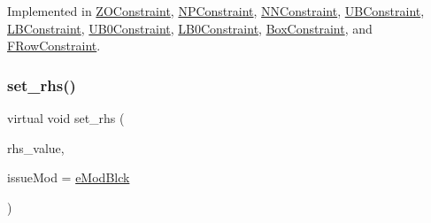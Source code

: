 Implemented in \mbox{\hyperlink{class_s_m_spp__di__unipi__it_1_1_z_o_constraint_a04d6bd47ee1aef8d3bfa2486b2732bd3}{Z\+O\+Constraint}}, \mbox{\hyperlink{class_s_m_spp__di__unipi__it_1_1_n_p_constraint_a307924d9ed36541d2a4fc32494c087ee}{N\+P\+Constraint}}, \mbox{\hyperlink{class_s_m_spp__di__unipi__it_1_1_n_n_constraint_a307924d9ed36541d2a4fc32494c087ee}{N\+N\+Constraint}}, \mbox{\hyperlink{class_s_m_spp__di__unipi__it_1_1_u_b_constraint_a307924d9ed36541d2a4fc32494c087ee}{U\+B\+Constraint}}, \mbox{\hyperlink{class_s_m_spp__di__unipi__it_1_1_l_b_constraint_a307924d9ed36541d2a4fc32494c087ee}{L\+B\+Constraint}}, \mbox{\hyperlink{class_s_m_spp__di__unipi__it_1_1_u_b0_constraint_a307924d9ed36541d2a4fc32494c087ee}{U\+B0\+Constraint}}, \mbox{\hyperlink{class_s_m_spp__di__unipi__it_1_1_l_b0_constraint_a307924d9ed36541d2a4fc32494c087ee}{L\+B0\+Constraint}}, \mbox{\hyperlink{class_s_m_spp__di__unipi__it_1_1_box_constraint_a04d6bd47ee1aef8d3bfa2486b2732bd3}{Box\+Constraint}}, and \mbox{\hyperlink{class_s_m_spp__di__unipi__it_1_1_f_row_constraint_a04d6bd47ee1aef8d3bfa2486b2732bd3}{F\+Row\+Constraint}}.

\mbox{\label{class_s_m_spp__di__unipi__it_1_1_row_constraint_a42d5ec40966a094c7fa805a5ea44337b}} 
\subsubsection{\texorpdfstring{set\+\_\+rhs()}{set\_rhs()}}
{\footnotesize\ttfamily virtual void set\+\_\+rhs (\begin{DoxyParamCaption}\item[{\mbox{\hyperlink{class_s_m_spp__di__unipi__it_1_1_row_constraint_a34abd4b01d3a2024be5f6d13dd88779f}{c\+\_\+\+R\+H\+S\+Value}}}]{rhs\+\_\+value,  }\item[{\mbox{\hyperlink{group___modification___t_y_p_e_s_ga544246d8c462e9a2d817c2c30797968f}{c\+\_\+\+Mod\+Param}}}]{issue\+Mod = {\ttfamily \mbox{\hyperlink{group___modification___t_y_p_e_s_gga48fddcdd03a03f49b7e389ca1ed938d4a21b14b26b1c0093a0905f6fc010bad29}{e\+Mod\+Blck}}} }\end{DoxyParamCaption})\hspace{0.3cm}{\ttfamily [pure virtual]}}



